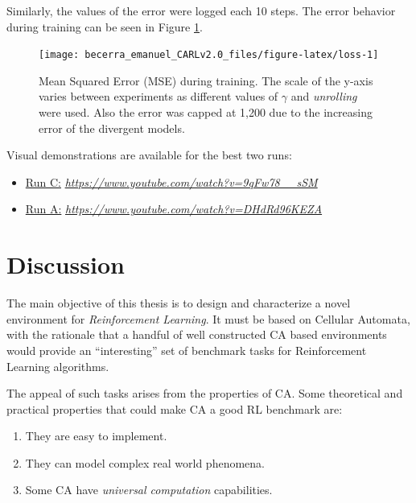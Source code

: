 \documentclass[
  12pt,
  openany]{book}
\providecommand{\tightlist}{%
  \setlength{\itemsep}{0pt}\setlength{\parskip}{0pt}}
\begin{document}
Similarly, the values of the error were logged each 10 steps. The error behavior during training can be seen in Figure \ref{fig:loss}.



\begin{figure}

{\centering \texttt{[image: becerra\_emanuel\_CARLv2.0\_files/figure-latex/loss-1]} 

}

\caption{Mean Squared Error (MSE) during training. The scale of the y-axis varies between experiments as different values of \(\gamma\) and \emph{unrolling} were used. Also the error was capped at 1,200 due to the increasing error of the divergent models.}\label{fig:loss}
\end{figure}

Visual demonstrations are available for the best two runs:

\begin{itemize}
\tightlist
\item
  \href{https://www.youtube.com/watch?v=9qFw78__sSM}{Run C:} \emph{\url{https://www.youtube.com/watch?v=9qFw78__sSM}}
\item
  \href{https://www.youtube.com/watch?v=DHdRd96KEZA}{Run A:} \emph{\url{https://www.youtube.com/watch?v=DHdRd96KEZA}}
\end{itemize}

\hypertarget{discussion}{%
\section{Discussion}\label{discussion}}

The main objective of this thesis is to design and characterize a novel environment for \emph{Reinforcement Learning}. It must be based on Cellular Automata, with the rationale that a handful of well constructed CA based environments would provide an ``interesting'' set of benchmark tasks for Reinforcement Learning algorithms.

The appeal of such tasks arises from the properties of CA. Some theoretical and practical properties that could make CA a good RL benchmark are:

\begin{enumerate}
\def\labelenumi{\arabic{enumi}.}
\tightlist
\item
  They are easy to implement.
\item
  They can model complex real world phenomena.
\item
  Some CA have \emph{universal computation} capabilities.
\end{enumerate}
\end{document}
